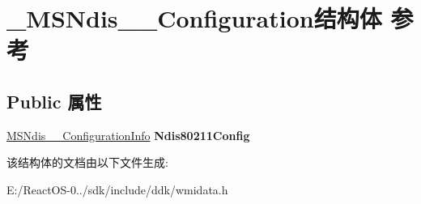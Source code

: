 \hypertarget{struct___m_s_ndis__80211___configuration}{}\section{\+\_\+\+M\+S\+Ndis\+\_\+\_\+\+Configuration结构体 参考}
\label{struct___m_s_ndis__80211___configuration}
\subsection*{Public 属性}
\begin{DoxyCompactItemize}
\item 
\mbox{\label{struct___m_s_ndis__80211___configuration_aa1c91b87a22ed10441bd3834e0811fb0}} 
\hyperlink{struct___m_s_ndis__80211___configuration_info}{M\+S\+Ndis\+\_\+\_\+\+Configuration\+Info} {\bfseries Ndis80211\+Config}
\end{DoxyCompactItemize}


该结构体的文档由以下文件生成\+:\begin{DoxyCompactItemize}
\item 
E\+:/\+React\+O\+S-\/0../sdk/include/ddk/wmidata.\+h\end{DoxyCompactItemize}
